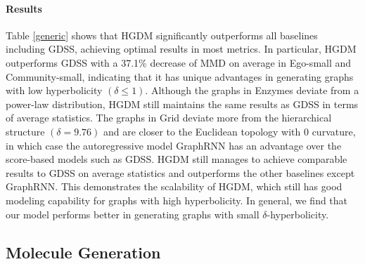 \documentclass[letterpaper]{article} %
\begin{document}
\paragraph{Results}
Table \ref{generic} shows that HGDM significantly outperforms all baselines including GDSS, achieving optimal results in most metrics. In particular, HGDM outperforms GDSS with a 37.1\% decrease of MMD on average in Ego-small and Community-small, indicating that it has unique advantages in generating graphs with low hyperbolicity $(\delta\le 1)$.
Although the graphs in Enzymes deviate from a power-law distribution,
HGDM still maintains the same results as GDSS in terms of average statistics.
The graphs in Grid deviate more from the hierarchical structure $(\delta=9.76)$ and are closer to the Euclidean topology with 0 curvature, in which case the autoregressive model GraphRNN has an advantage over the score-based models such as GDSS.
HGDM still manages to achieve comparable results to GDSS on average statistics and outperforms the other baselines except GraphRNN.
This demonstrates the scalability of HGDM, which still has good modeling capability for graphs with high hyperbolicity.
In general, we find that our model performs better in generating graphs with small $\delta$-hyperbolicity.

\subsection{Molecule Generation}
\end{document}
